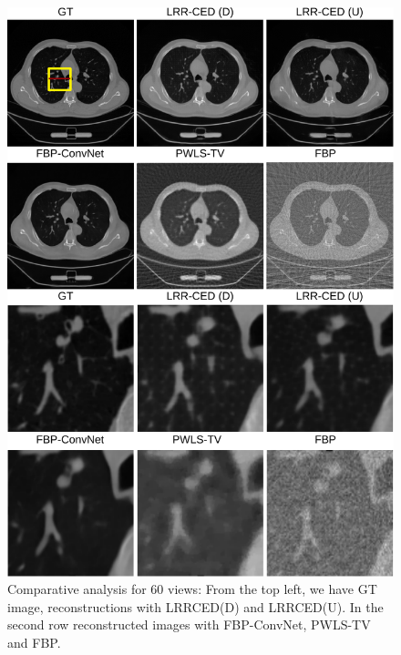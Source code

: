 \begin{figure}[!t]
	\centering
	\includegraphics[width=1.0\linewidth]{./Figures/results1-crop.pdf}
	\caption{Comparative analysis for 60 views: From the top left, we have \ac{GT} image, reconstructions with \ac{LRRCED}(D) and \ac{LRRCED}(U). In the second row reconstructed images with FBP-ConvNet, PWLS-TV and \ac{FBP}. }
	\label{fig:res_60}
\end{figure}

